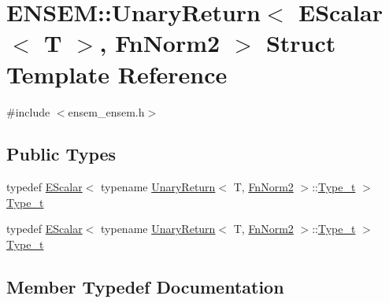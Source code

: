 \hypertarget{structENSEM_1_1UnaryReturn_3_01EScalar_3_01T_01_4_00_01FnNorm2_01_4}{}\section{E\+N\+S\+EM\+:\+:Unary\+Return$<$ E\+Scalar$<$ T $>$, Fn\+Norm2 $>$ Struct Template Reference}
\label{structENSEM_1_1UnaryReturn_3_01EScalar_3_01T_01_4_00_01FnNorm2_01_4}


{\ttfamily \#include $<$ensem\+\_\+ensem.\+h$>$}

\subsection*{Public Types}
\begin{DoxyCompactItemize}
\item 
typedef \mbox{\hyperlink{classENSEM_1_1EScalar}{E\+Scalar}}$<$ typename \mbox{\hyperlink{structENSEM_1_1UnaryReturn}{Unary\+Return}}$<$ T, \mbox{\hyperlink{structENSEM_1_1FnNorm2}{Fn\+Norm2}} $>$\+::\mbox{\hyperlink{structENSEM_1_1UnaryReturn_3_01EScalar_3_01T_01_4_00_01FnNorm2_01_4_acb54ade58c6e4e3f443f349d5ddb92e1}{Type\+\_\+t}} $>$ \mbox{\hyperlink{structENSEM_1_1UnaryReturn_3_01EScalar_3_01T_01_4_00_01FnNorm2_01_4_acb54ade58c6e4e3f443f349d5ddb92e1}{Type\+\_\+t}}
\item 
typedef \mbox{\hyperlink{classENSEM_1_1EScalar}{E\+Scalar}}$<$ typename \mbox{\hyperlink{structENSEM_1_1UnaryReturn}{Unary\+Return}}$<$ T, \mbox{\hyperlink{structENSEM_1_1FnNorm2}{Fn\+Norm2}} $>$\+::\mbox{\hyperlink{structENSEM_1_1UnaryReturn_3_01EScalar_3_01T_01_4_00_01FnNorm2_01_4_acb54ade58c6e4e3f443f349d5ddb92e1}{Type\+\_\+t}} $>$ \mbox{\hyperlink{structENSEM_1_1UnaryReturn_3_01EScalar_3_01T_01_4_00_01FnNorm2_01_4_acb54ade58c6e4e3f443f349d5ddb92e1}{Type\+\_\+t}}
\end{DoxyCompactItemize}


\subsection{Member Typedef Documentation}
\mbox{\label{structENSEM_1_1UnaryReturn_3_01EScalar_3_01T_01_4_00_01FnNorm2_01_4_acb54ade58c6e4e3f443f349d5ddb92e1}} 
